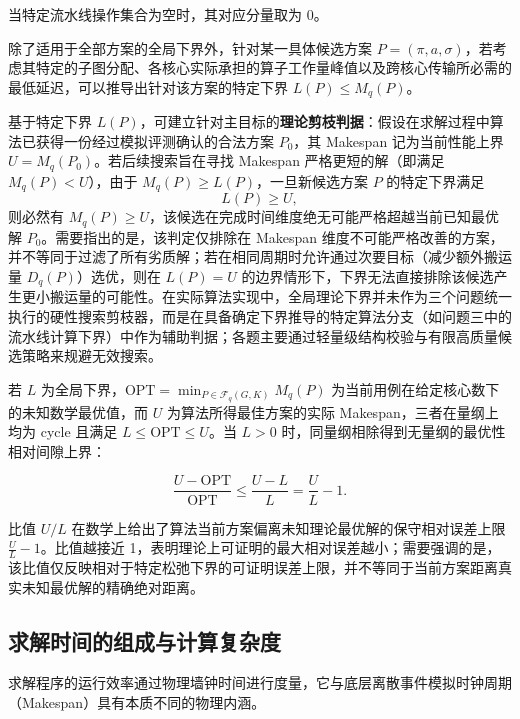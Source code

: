 \documentclass[anonymous,notoc]{gmcm2026}
\begin{document}
当特定流水线操作集合为空时，其对应分量取为 0。

除了适用于全部方案的全局下界外，针对某一具体候选方案 \(P = (\pi, a, \sigma)\)，若考虑其特定的子图分配、各核心实际承担的算子工作量峰值以及跨核心传输所必需的最低延迟，可以推导出针对该方案的特定下界 \(L(P) \le M_q(P)\)。

基于特定下界 \(L(P)\)，可建立针对主目标的\textbf{理论剪枝判据}：假设在求解过程中算法已获得一份经过模拟评测确认的合法方案 \(P_0\)，其 Makespan 记为当前性能上界 \(U = M_q(P_0)\)。若后续搜索旨在寻找 Makespan 严格更短的解（即满足 \(M_q(P) < U\)），由于 \(M_q(P) \ge L(P)\)，一旦新候选方案 \(P\) 的特定下界满足 \begin{equation}
L(P) \ge U,
\end{equation} 则必然有 \(M_q(P) \ge U\)，该候选在完成时间维度绝无可能严格超越当前已知最优解 \(P_0\)。需要指出的是，该判定仅排除在 Makespan 维度不可能严格改善的方案，并不等同于过滤了所有劣质解；若在相同周期时允许通过次要目标（减少额外搬运量 \(D_q(P)\)）选优，则在 \(L(P) = U\) 的边界情形下，下界无法直接排除该候选产生更小搬运量的可能性。在实际算法实现中，全局理论下界并未作为三个问题统一执行的硬性搜索剪枝器，而是在具备确定下界推导的特定算法分支（如问题三中的流水线计算下界）中作为辅助判据；各题主要通过轻量级结构校验与有限高质量候选策略来规避无效搜索。

若 \(L\) 为全局下界，\(\mathrm{OPT} = \min_{P \in \mathcal{F}_q(G, K)} M_q(P)\) 为当前用例在给定核心数下的未知数学最优值，而 \(U\) 为算法所得最佳方案的实际 Makespan，三者在量纲上均为 cycle 且满足 \(L \le \mathrm{OPT} \le U\)。当 \(L > 0\) 时，同量纲相除得到无量纲的最优性相对间隙上界：

\begin{equation}
\frac{U - \mathrm{OPT}}{\mathrm{OPT}} \le \frac{U - L}{L} = \frac{U}{L} - 1.
\end{equation}

比值 \(U/L\) 在数学上给出了算法当前方案偏离未知理论最优解的保守相对误差上限 \(\frac{U}{L} - 1\)。比值越接近 1，表明理论上可证明的最大相对误差越小；需要强调的是，该比值仅反映相对于特定松弛下界的可证明误差上限，并不等同于当前方案距离真实未知最优解的精确绝对距离。

\subsection{求解时间的组成与计算复杂度}

求解程序的运行效率通过物理墙钟时间进行度量，它与底层离散事件模拟时钟周期（Makespan）具有本质不同的物理内涵。
\end{document}
